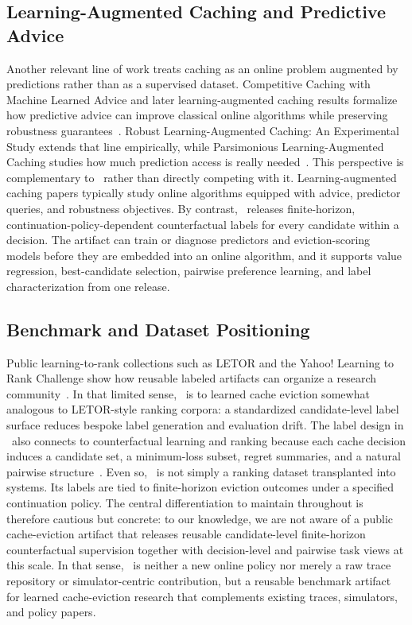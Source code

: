 \subsection{Learning-Augmented Caching and Predictive Advice}

Another relevant line of work treats caching as an online problem augmented by predictions rather than as a supervised dataset. Competitive Caching with Machine Learned Advice and later learning-augmented caching results formalize how predictive advice can improve classical online algorithms while preserving robustness guarantees~\cite{lykouris2021mladvice,wei2020learningaugcache}. Robust Learning-Augmented Caching: An Experimental Study extends that line empirically, while Parsimonious Learning-Augmented Caching studies how much prediction access is really needed~\cite{chledowski2021robustlac,im2022parsimoniouslac}. This perspective is complementary to \lafc\ rather than directly competing with it. Learning-augmented caching papers typically study online algorithms equipped with advice, predictor queries, and robustness objectives. By contrast, \lafc\ releases finite-horizon, continuation-policy-dependent counterfactual labels for every candidate within a decision. The artifact can train or diagnose predictors and eviction-scoring models before they are embedded into an online algorithm, and it supports value regression, best-candidate selection, pairwise preference learning, and label characterization from one release.

\subsection{Benchmark and Dataset Positioning}

Public learning-to-rank collections such as LETOR and the Yahoo! Learning to Rank Challenge show how reusable labeled artifacts can organize a research community~\cite{liu2009ltr,qin2010letor,chapelle2011yahoo}. In that limited sense, \lafc\ is to learned cache eviction somewhat analogous to LETOR-style ranking corpora: a standardized candidate-level label surface reduces bespoke label generation and evaluation drift. The label design in \lafc\ also connects to counterfactual learning and ranking because each cache decision induces a candidate set, a minimum-loss subset, regret summaries, and a natural pairwise structure~\cite{swaminathan2015crm,li2011offlinecb,joachims2017unbiasedltr,saito2020pairwise}. Even so, \lafc\ is not simply a ranking dataset transplanted into systems. Its labels are tied to finite-horizon eviction outcomes under a specified continuation policy. The central differentiation to maintain throughout is therefore cautious but concrete: to our knowledge, we are not aware of a public cache-eviction artifact that releases reusable candidate-level finite-horizon counterfactual supervision together with decision-level and pairwise task views at this scale. In that sense, \lafc\ is neither a new online policy nor merely a raw trace repository or simulator-centric contribution, but a reusable benchmark artifact for learned cache-eviction research that complements existing traces, simulators, and policy papers.

\endgroup
